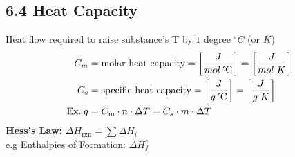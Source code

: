 \subsection{6.4 Heat Capacity}
    Heat flow required to raise substance's T by $1$ degree $^\circ C$ (or $K$)
    \begin{align*}
        C_m & = \text{molar heat capacity} = \left[\frac{J}{mol \; \tccentigrade}\right] = \left[\frac{J}{mol \; K}\right]\\
        C_s & = \text{specific heat capacity} = \left[\frac{J}{g \; \tccentigrade}\right] = \left[\frac{J}{g \; K}\right]\\
        \text{Ex.} \; q & = C_\text{m} \cdot n \cdot \Delta T = C_s \cdot m \cdot \Delta T
    \end{align*}
    \textbf{Hess's Law:} $\Delta H_\text{rxn} = \sum \Delta H_i$\\
    e.g Enthalpies of Formation: $\Delta H^\circ_f$